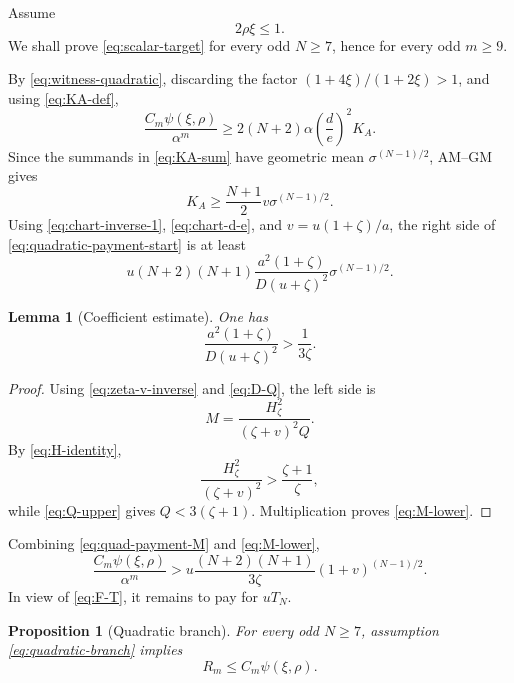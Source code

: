 \documentclass[11pt]{article}
\newtheorem{proposition}[theorem]{Proposition}
\newtheorem{lemma}[theorem]{Lemma}
\begin{document}
Assume
\begin{equation}\label{eq:quadratic-branch}
       2\rho\xi\le1.
\end{equation}
We shall prove \eqref{eq:scalar-target} for every odd \(N\ge7\), hence for
every odd \(m\ge9\).

By \eqref{eq:witness-quadratic}, discarding the factor
\((1+4\xi)/(1+2\xi)>1\), and using \eqref{eq:KA-def},
\begin{equation}\label{eq:quadratic-payment-start}
 \frac{C_m\psi(\xi,\rho)}{\alpha^m}
 \ge2(N+2)\alpha\left(\frac de\right)^2K_A.
\end{equation}
Since the summands in \eqref{eq:KA-sum} have geometric mean
\(\sigma^{(N-1)/2}\), AM--GM gives
\begin{equation}\label{eq:KA-AMGM}
       K_A\ge\frac{N+1}{2}
       v\sigma^{(N-1)/2}.
\end{equation}
Using \eqref{eq:chart-inverse-1}, \eqref{eq:chart-d-e}, and
\(v=u(1+\zeta)/a\), the right side of
\eqref{eq:quadratic-payment-start} is at least
\begin{equation}\label{eq:quad-payment-M}
 u(N+2)(N+1)
 \frac{a^2(1+\zeta)}{D(u+\zeta)^2}
 \sigma^{(N-1)/2}.
\end{equation}

\begin{lemma}[Coefficient estimate]\label{lem:quad-coeff}
One has
\begin{equation}\label{eq:M-lower}
       \frac{a^2(1+\zeta)}{D(u+\zeta)^2}
       >\frac1{3\zeta}.
\end{equation}
\end{lemma}

\begin{proof}
Using \eqref{eq:zeta-v-inverse} and \eqref{eq:D-Q}, the left side is
\[
       M=\frac{H_\zeta^2}{(\zeta+v)^2Q}.
\]
By \eqref{eq:H-identity},
\[
       \frac{H_\zeta^2}{(\zeta+v)^2}
       >\frac{\zeta+1}{\zeta},
\]
while \eqref{eq:Q-upper} gives \(Q<3(\zeta+1)\).  Multiplication proves
\eqref{eq:M-lower}.
\end{proof}

Combining \eqref{eq:quad-payment-M} and \eqref{eq:M-lower},
\begin{equation}\label{eq:quad-payment-final}
 \frac{C_m\psi(\xi,\rho)}{\alpha^m}
 >u\frac{(N+2)(N+1)}{3\zeta}
    (1+v)^{(N-1)/2}.
\end{equation}
In view of \eqref{eq:F-T}, it remains to pay for \(uT_N\).

\begin{proposition}[Quadratic branch]\label{prop:quadratic-branch}
For every odd \(N\ge7\), assumption \eqref{eq:quadratic-branch} implies
\[
       R_m\le C_m\psi(\xi,\rho).
\]
\end{proposition}
\end{document}

